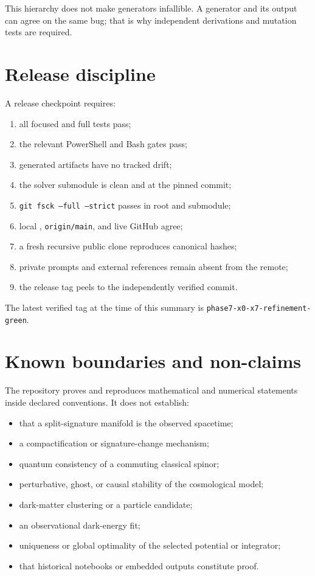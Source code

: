 \documentclass[11pt]{article}
\begin{document}
This hierarchy does not make generators infallible. A generator and its output can agree on the same bug; that is why independent derivations and mutation tests are required.

\section{Release discipline}

A release checkpoint requires:

\begin{enumerate}
\item all focused and full tests pass;
\item the relevant PowerShell and Bash gates pass;
\item generated artifacts have no tracked drift;
\item the solver submodule is clean and at the pinned commit;
\item \texttt{git fsck\allowbreak{} --full \allowbreak{}--strict} passes in root and submodule;
\item local \texttt{}, \texttt{origin/m\allowbreak{}ain}, and live GitHub \texttt{} agree;
\item a fresh recursive public clone reproduces canonical hashes;
\item private prompts and external references remain absent from the remote;
\item the release tag peels to the independently verified commit.
\end{enumerate}

The latest verified tag at the time of this summary is \texttt{phase7-x\allowbreak{}0-x7-ref\allowbreak{}inement-\allowbreak{}green}.

\section{Known boundaries and non-claims}

The repository proves and reproduces mathematical and numerical statements inside declared conventions. It does not establish:

\begin{itemize}
\item that a split-signature \texttt{} manifold is the observed spacetime;
\item a compactification or signature-change mechanism;
\item quantum consistency of a commuting classical spinor;
\item perturbative, ghost, or causal stability of the cosmological model;
\item dark-matter clustering or a particle candidate;
\item an observational dark-energy fit;
\item uniqueness or global optimality of the selected potential or integrator;
\item that historical notebooks or embedded outputs constitute proof.
\end{itemize}
\end{document}
